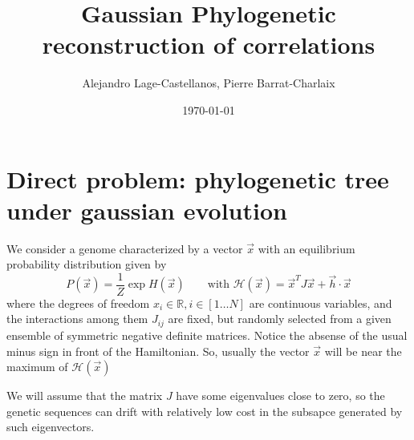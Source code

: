 \documentclass[10pt]{article}
\def\be{\begin{equation}}
\def\ee{\end{equation}}
\def\vx{\vec x}
\def\vh{\vec h}
\newcommand{\Ham}{\mathcal{H}}
\def\Jij{J_{ij}}
\begin{document}
\title{Gaussian Phylogenetic reconstruction of correlations}
  
\author{Alejandro Lage-Castellanos, Pierre Barrat-Charlaix}


\date{\today}



\maketitle

\section{Direct problem: phylogenetic tree under gaussian evolution }

We consider a genome characterized by a vector $\vec x$ with an equilibrium probability distribution given by
\be
P(\vec x) =\frac 1 Z \exp H(\vec x) \qquad \mbox{with } \Ham(\vx) = \vx^T J \vx + \vh \cdot \vx \label{eq:equil}
\ee
where the degrees of freedom $x_i \in \mathbb R, i\in [1\ldots N]$ are continuous variables, and the interactions among them $\Jij$ are fixed, but randomly selected 
from a given ensemble of symmetric negative definite matrices. Notice the absense of the usual minus sign in front of the Hamiltonian. So, usually the vector $\vx$ will be near the maximum of $\Ham(\vx)$

We will assume that the matrix $J$ have some eigenvalues close to zero, so the genetic sequences can drift with relatively low cost in the subsapce generated by such eigenvectors. 

\end{document}
